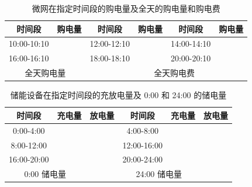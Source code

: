 %


\begin{table}[htbp]
  \centering
  \caption{微网在指定时间段的购电量及全天的购电量和购电费}
  \label{tab:1}
  \begin{tabular}{|c|c|c|c|c|c|}
    \hline
    时间段      & 购电量 & 时间段      & 购电量 & 时间段      & 购电量 \\ \hline
    10:00-10:10 &        & 12:00-12:10 &        & 14:00-14:10 &        \\ \hline
    16:00-16:10 &        & 18:00-18:10 &        & 20:00-20:10 &        \\ \hline
    \multicolumn{2}{|c|}{全天购电量} & &
    \multicolumn{2}{c|}{全天购电费} &        \\ \hline
  \end{tabular}
\end{table}


\begin{table}[htbp]
  \centering
  \caption{储能设备在指定时间段的充放电量及 0:00 和 24:00 的储电量}
  \label{tab:2}
  \begin{tabular}{|c|c|c|c|c|c|}
    \hline
    时间段     & 充电量 & 放电量 & 时间段      & 充电量 & 放电量 \\ \hline
    0:00-4:00  &        &        & 4:00-8:00   &        &        \\ \hline
    8:00-12:00 &        &        & 12:00-16:00 &        &        \\ \hline
    16:00-20:00&        &        & 20:00-24:00 &        &        \\ \hline
    \multicolumn{2}{|c|}{0:00 储电量}  & &
    \multicolumn{2}{c|}{24:00 储电量} &        \\ \hline
  \end{tabular}
\end{table}


